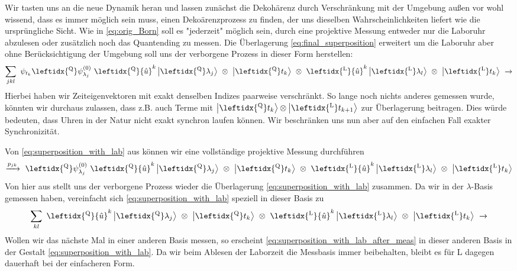 \documentclass[12pt]{article}
\begin{document}
Wir tasten uns an die neue Dynamik heran und lassen zunächst die Dekohärenz durch Verschränkung mit der Umgebung außen vor wohl wissend, dass es immer möglich sein muss, einen Dekoärenzprozess zu finden, der uns dieselben Wahrscheinlichkeiten liefert wie die ursprüngliche Sicht. Wie in \eqref{eq:orig_Born} soll es "jederzeit" möglich sein, durch eine projektive Messung entweder nur die Laboruhr abzulesen oder zusätzlich noch das Quantending zu messen. Die Überlagerung \eqref{eq:final_superposition} erweitert um die Laboruhr aber ohne Berücksichtigung der Umgebung soll uns der verborgene Prozess in dieser Form herstellen:
\begin{equation}
\label{eq:superposition_with_lab}
\sum_{jkl}\ \psi_{t_k} \leftidx{^\mathrm{Q}}\psi_{\lambda_j}^{(0)}\ 
\leftidx{^\mathrm{Q}}{\hat{u}}^k 
\ket{\leftidx{^\mathrm{Q}}\lambda_j} 
\ \otimes\ \ket{\leftidx{^\mathrm{Q}}t_k}
\ \otimes\ \leftidx{^\mathrm{L}}{\hat{u}}^k \ket{ \leftidx{^\mathrm{L}}\lambda_l} 
\ \otimes\ \ket{\leftidx{^\mathrm{L}}t_k}
\ \xrightarrow{}
\end{equation}
Hierbei haben wir Zeiteigenvektoren mit exakt denselben Indizes paarweise verschränkt. So lange noch nichts anderes gemessen wurde, könnten wir durchaus zulassen, dass z.B. auch Terme mit $\ket{\leftidx{^\mathrm{Q}}t_k} \otimes \ket{\leftidx{^\mathrm{L}}t_{k+1}}$ zur Überlagerung beitragen. Dies würde bedeuten, dass Uhren in der Natur nicht exakt synchron laufen können. Wir beschränken uns nun aber auf den einfachen Fall exakter Synchronizität.

Von \eqref{eq:superposition_with_lab} aus können wir eine vollständige projektive Messung durchführen
\begin{equation}
\xrightarrow{p_{jk}}\ \leftidx{^\mathrm{Q}}\psi_{\lambda_j}^{(0)}\ 
\leftidx{^\mathrm{Q}}{\hat{u}}^k
\ket{\leftidx{^\mathrm{Q}}\lambda_j} 
\ \otimes\ \ket{\leftidx{^\mathrm{Q}}t_k}
\ \otimes\ \leftidx{^\mathrm{L}}{\hat{u}}^k \ket{ \leftidx{^\mathrm{L}}\lambda_l} 
\ \otimes\ \ket{\leftidx{^\mathrm{L}}t_k}
\end{equation}
Von hier aus stellt uns der verborgene Prozess wieder die Überlagerung \eqref{eq:superposition_with_lab} zusammen. Da wir in der $\lambda$-Basis gemessen haben, vereinfacht sich \eqref{eq:superposition_with_lab} speziell in dieser Basis zu 
\begin{equation}
\label{eq:superposition_with_lab_after_meas}
\sum_{kl}\ \leftidx{^\mathrm{Q}}{\hat{u}}^k
\ket{\leftidx{^\mathrm{Q}}\lambda_j} 
\ \otimes\ \ket{\leftidx{^\mathrm{Q}}t_k}
\ \otimes\ \leftidx{^\mathrm{L}}{\hat{u}}^k \ket{ \leftidx{^\mathrm{L}}\lambda_l} 
\ \otimes\ \ket{\leftidx{^\mathrm{L}}t_k}
\ \xrightarrow{}
\end{equation}
Wollen wir das nächste Mal in einer anderen Basis messen, so erscheint \eqref{eq:superposition_with_lab_after_meas} in dieser anderen Basis in der Gestalt \eqref{eq:superposition_with_lab}. Da wir beim Ablesen der Laborzeit die Messbasis immer beibehalten, bleibt es für L dagegen dauerhaft bei der einfacheren Form.
\end{document}
